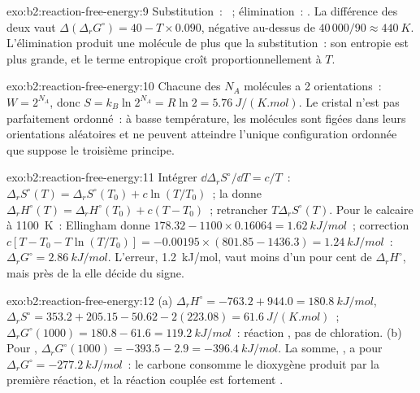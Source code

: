 \begin{solution}{exo:b2:reaction-free-energy:9}
Substitution~: ~; élimination~:
. La différence des deux
 vaut $\Delta(\Delta_r G^\circ) = 40 - T \times
0.090$, négative au-dessus de $40\,000/90 \approx \qty{440}{K}$. L'élimination produit
une molécule de plus que la substitution~: son entropie est plus grande, et le terme
entropique croît proportionnellement à $T$.
\end{solution}

\begin{solution}{exo:b2:reaction-free-energy:10}
Chacune des $N_A$ molécules a 2 orientations~: $W = 2^{N_A}$, donc $S =
k_B\ln 2^{N_A} = R\ln 2 = \qty{5.76}{J/(K.mol)}$. Le cristal n'est pas
parfaitement ordonné~: à basse température, les molécules sont figées dans leurs
orientations aléatoires et ne peuvent atteindre l'unique configuration ordonnée que suppose
le troisième principe.
\end{solution}

\begin{solution}{exo:b2:reaction-free-energy:11}
Intégrer $\dd\Delta_r S^\circ/\dd T = c/T$~: $\Delta_r S^\circ(T) = \Delta_r
S^\circ(T_0) + c\ln(T/T_0)$~; la  donne $\Delta_r H^\circ(T) = \Delta_r
H^\circ(T_0) + c(T - T_0)$~; retrancher $T\Delta_r S^\circ(T)$. Pour le calcaire à
\qty{1100}{K}~: Ellingham donne $178.32 - 1100 \times 0.16064 = \qty{1.62}{kJ/mol}$~;
correction $c[T - T_0 - T\ln(T/T_0)] = -0.00195 \times (801.85 - 1436.3) =
\qty{+1.24}{kJ/mol}$~: $\Delta_r G^\circ = \qty{2.86}{kJ/mol}$. L'erreur,
\qty{1.2}{kJ/mol}, vaut moins d'un pour cent de $\Delta_r H^\circ$, mais près de
la  elle décide du signe.
\end{solution}

\begin{solution}{exo:b2:reaction-free-energy:12}
(a) $\Delta_r H^\circ = -763.2 + 944.0 = \qty{+180.8}{kJ/mol}$, $\Delta_r
S^\circ = 353.2 + 205.15 - 50.62 - 2(223.08) = \qty{+61.6}{J/(K.mol)}$~;
$\Delta_r G^\circ(1000) = 180.8 - 61.6 = \qty{+119.2}{kJ/mol}$~: réaction ,
pas de chloration. (b) Pour , $\Delta_r G^\circ(1000) =
-393.5 - 2.9 = \qty{-396.4}{kJ/mol}$. La somme, , a pour $\Delta_r G^\circ = \qty{-277.2}{kJ/mol}$~: le carbone
consomme le dioxygène produit par la première réaction, et la réaction couplée est
fortement .
\end{solution}

